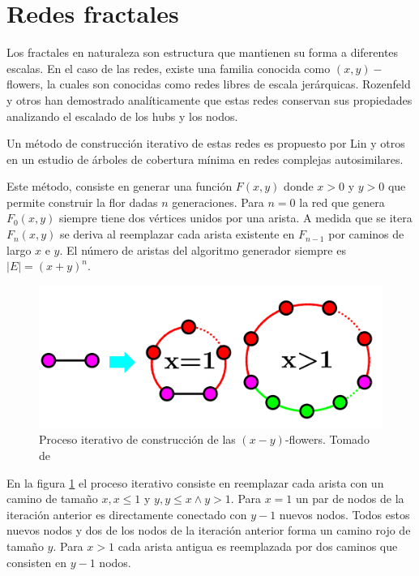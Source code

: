 \section{Redes fractales}

Los fractales en naturaleza son estructura que mantienen su forma a diferentes escalas. En el caso de las redes, existe una familia conocida como $(x,y)-$flowers\cite{Rozenfeld2007}, la cuales son conocidas como redes libres de escala jerárquicas. Rozenfeld y otros\cite{Rozenfeld2007B} han demostrado analíticamente que estas redes conservan sus propiedades analizando el escalado de los hubs y los nodos.

Un método de construcción iterativo de estas redes es propuesto por Lin y otros\cite{Lin2011} en un estudio de árboles de cobertura mínima en redes complejas autosimilares.

Este método, consiste en generar una función $F(x,y)$ donde $x>0$ y $y>0$ que permite construir la flor dadas $n$ generaciones. Para $n=0$ la red que genera $F_0(x,y)$ siempre tiene dos vértices unidos por una arista.  A medida que se itera $F_n(x,y)$ se deriva al reemplazar cada arista existente en $F_{n-1}$ por caminos de largo $x$ e $y$. El número de aristas del algoritmo generador siempre es $|E| = (x+y)^n$. 

\begin{figure}[H]
    \centering
    \includegraphics[scale=0.5]{Capitulo3GeneracionRedesFractales/imagenes/florA.png}
    \caption{Proceso iterativo de construcción de las $(x-y)$-flowers. Tomado de \cite{Lin2011}}
    \label{fig:floarA}
\end{figure}

En la figura \ref{fig:floarA} el proceso iterativo consiste en reemplazar cada arista con un camino de tamaño $x, x\leq 1$ y $y, y\leq x \wedge y > 1$. Para $x=1$ un par de nodos de la iteración anterior es directamente conectado con $y-1$ nuevos nodos. Todos estos nuevos nodos y dos de los nodos de la iteración anterior forma un camino rojo de tamaño $y$. Para $x>1$ cada arista antigua es reemplazada por dos caminos que consisten en $y-1$ nodos.

